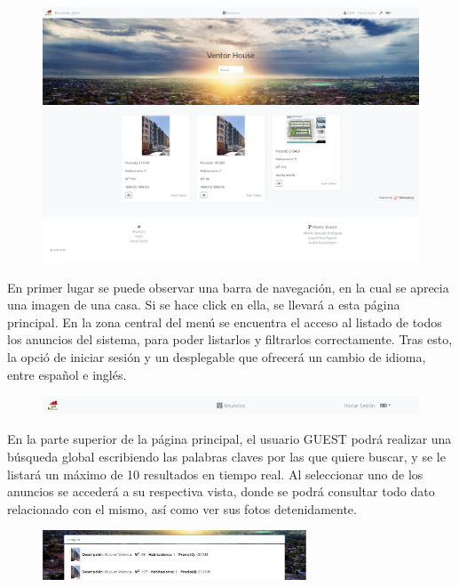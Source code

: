 \begin{figure}[h!]
\centering
\includegraphics[width=.7\textwidth]{Img/ManualUsuario/PPAL_GUEST.jpg}
\end{figure}

En primer lugar se puede observar una barra de navegaci\'{o}n, en la cual se aprecia una imagen de una casa. Si se hace click en ella, se llevar\'{a} a esta p\'{a}gina principal. En la zona central del men\'{u} se encuentra el acceso al listado de todos los anuncios del sistema, para poder listarlos y filtrarlos correctamente. Tras esto, la opci\'{o} de iniciar sesi\'{o}n y un desplegable que ofrecer\'{a} un cambio de idioma, entre espa\~{n}ol e ingl\'{e}s.

\begin{figure}[h!]
\centering
\includegraphics[width=1\textwidth]{Img/ManualUsuario/NAV_GUEST.png}
\end{figure}


En la parte superior de la p\'{a}gina principal, el usuario GUEST podr\'{a} realizar una b\'{u}squeda global escribiendo las palabras claves por las que quiere buscar, y se le listar\'{a} un m\'{a}ximo de 10 resultados en tiempo real. Al seleccionar uno de los anuncios se acceder\'{a} a su respectiva vista, donde se podr\'{a} consultar todo dato relacionado con el mismo, as\'{i} como ver sus fotos detenidamente.

\begin{figure}[h!]
\centering
\includegraphics[width=0.7\textwidth]{Img/ManualUsuario/GLOBAL_SEARCH_GUEST.jpg}
\end{figure}


